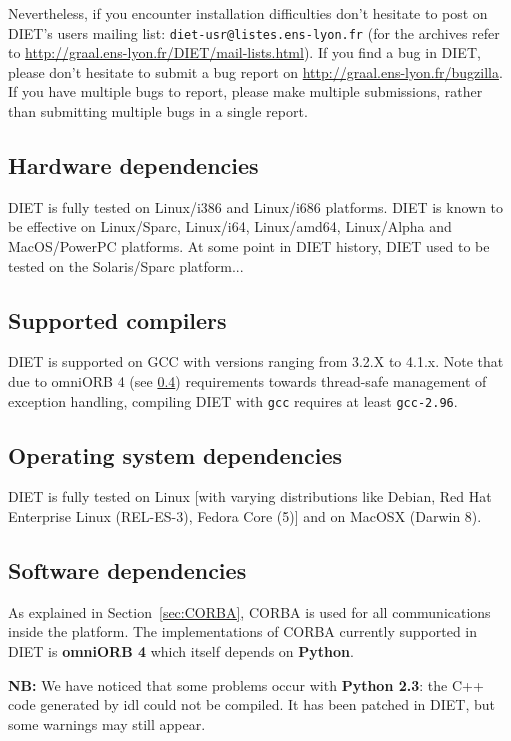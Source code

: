 Nevertheless, if you encounter installation difficulties don't hesitate
to post on DIET's users mailing list: \verb+diet-usr@listes.ens-lyon.fr+
(for the archives refer to \url{http://graal.ens-lyon.fr/DIET/mail-lists.html}).
If you find a bug in DIET, please don't hesitate to submit a bug report on
\url{http://graal.ens-lyon.fr/bugzilla}. If you have multiple bugs
to report, please make multiple submissions, rather than submitting
multiple bugs in a single report.

\subsection{Hardware dependencies}
DIET is fully tested on Linux/i386 and Linux/i686 platforms.
DIET is known to be effective on Linux/Sparc, Linux/i64, Linux/amd64,
Linux/Alpha and MacOS/PowerPC platforms.
At some point in DIET history, DIET used to be tested on the Solaris/Sparc
platform...

\subsection{Supported compilers}
DIET is supported on GCC with versions ranging from 3.2.X to 4.1.x.
Note that due to omniORB 4 (see \ref{sec:software_dependencies}) requirements
towards thread-safe management of exception handling, compiling DIET with
\verb+gcc+ requires at least \verb+gcc-2.96+.

\subsection{Operating system dependencies}
DIET is fully tested on Linux [with varying distributions like Debian,
Red Hat Enterprise Linux (REL-ES-3), Fedora Core (5)] and on MacOSX
(Darwin 8).

\subsection{Software dependencies}
\label{sec:software_dependencies}

As explained in Section~\ref{sec:CORBA}, CORBA is used for all
communications inside the platform.
The implementations of CORBA currently supported in DIET is
\textbf{omniORB 4} which itself depends on \textbf{Python}.

\noindent 
\textbf{NB:} We have noticed that some problems occur with
\textbf{Python 2.3}: the C++ code generated by idl could not be compiled.
It has been patched in DIET, but some warnings may still appear.

